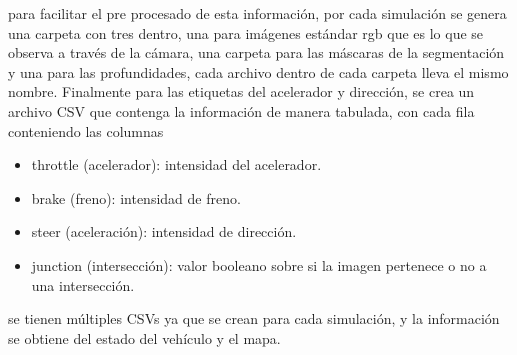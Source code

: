 para facilitar el pre procesado de esta información, por cada simulación se genera una carpeta con tres dentro, una para imágenes estándar rgb que es lo que se observa a través de la cámara, una carpeta para las máscaras de la segmentación y una para las profundidades, cada archivo dentro de cada carpeta lleva el mismo nombre. Finalmente para las etiquetas del acelerador y dirección, se crea un archivo CSV que contenga la información de manera tabulada, con cada fila conteniendo las columnas

\begin{itemize}[nosep]
	\item throttle (acelerador): intensidad del acelerador.
	\item brake (freno): intensidad de freno.
	\item steer (aceleración): intensidad de dirección.
	\item junction (intersección): valor booleano sobre si la imagen pertenece o no a una intersección.
\end{itemize}

se tienen múltiples CSVs ya que se crean para cada simulación, y la información se obtiene del estado del vehículo y el mapa.